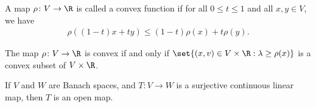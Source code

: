 \documentclass[10pt]{mypackage}
\begin{document}
\begin{definition}
  A map $\rho\colon V\to \R$ is called a convex function if for all $0\leq t \leq 1$ and all $x,y\in V$, we have 
  \begin{align*}
    \rho\left( \left( 1-t \right)x + ty \right)\leq \left( 1-t \right)\rho(x) + t\rho(y).
  \end{align*}
\end{definition}
\begin{proposition}
  The map $\rho\colon V\to \R$ is convex if and only if $\set{\left( x,v \right)\in V\times \R : \lambda\geq \rho(x)}$ is a convex subset of $V\times \R$.
\end{proposition}
\begin{theorem}
  If $V$ and $W$ are Banach spaces, and $T\colon V\to W$ is a surjective continuous linear map, then $T$ is an open map.
\end{theorem}
\end{document}
